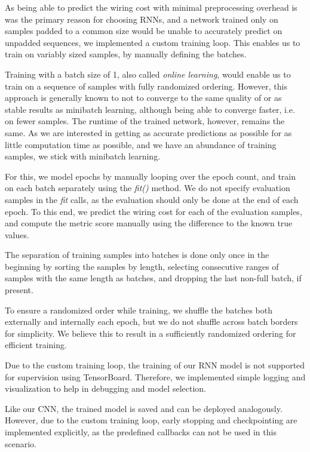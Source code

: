 As being able to predict the wiring cost with minimal preprocessing overhead is was the primary reason for choosing \glspl{RNN}, and a network trained only on samples padded to a common size would be unable to accurately predict on unpadded sequences, we implemented a custom training loop. This enables us to train on variably sized samples, by manually defining the batches.

Training with a batch size of 1, also called \textit{online learning}, would enable us to train on a sequence of samples with fully randomized ordering. However, this approach is generally known to not to converge to the same quality of or as stable results as minibatch learning, although being able to converge faster, i.e. on fewer samples. The runtime of the trained network, however, remains the same. As we are interested in getting as accurate predictions as possible for as little computation time as possible, and we have an abundance of training samples, we stick with minibatch learning.

For this, we model epochs by manually looping over the epoch count, and train on each batch separately using the \textit{fit()} method. We do not specify evaluation samples in the \textit{fit} calls, as the evaluation should only be done at the end of each epoch. To this end, we predict the wiring cost for each of the evaluation samples, and compute the metric score manually using the difference to the known true values.

The separation of training samples into batches is done only once in the beginning by sorting the samples by length, selecting consecutive ranges of samples with the same length as batches, and dropping the last non-full batch, if present.

To ensure a randomized order while training, we shuffle the batches both externally and internally each epoch, but we do not shuffle across batch borders for simplicity. We believe this to result in a sufficiently randomized ordering for efficient training.

Due to the custom training loop, the training of our \gls{RNN} model is not supported for supervision using TensorBoard. Therefore, we implemented simple logging and visualization to help in debugging and model selection.

Like our \gls{CNN}, the trained model is saved and can be deployed analogously. However, due to the custom training loop, early stopping and checkpointing are implemented explicitly, as the predefined callbacks can not be used in this scenario.

